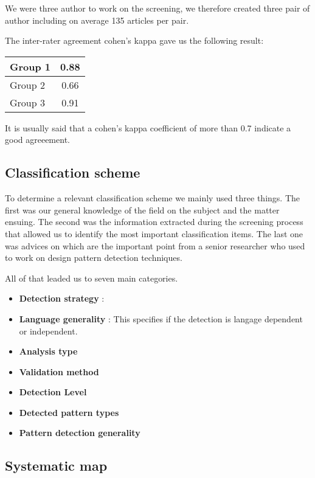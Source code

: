 \documentclass[letterpaper, 10 pt, conference]{ieeeconf}  %
\begin{document}
We were three author to work on the screening, we therefore created three pair of author including on average 135 articles per pair.

The inter-rater agreement cohen's kappa gave us the following result:

\begin{center}
  \begin{tabular}{ | l | c | }
    \hline
    Group 1 & 0.88 \\ \hline
    Group 2 & 0.66 \\ \hline
    Group 3 & 0.91 \\
    \hline
  \end{tabular}
\end{center}

It is usually said that a cohen's kappa coefficient of more than 0.7 indicate a good agreeement.%

\subsection{Classification scheme}

To determine a relevant classification scheme we mainly used three things. The first was our general knowledge of the field on the subject and the matter ensuing. The second was the information extracted during the screening process that allowed us to identify the most important classification items. The last one was advices on which are the important point from a senior researcher who used to work on design pattern detection techniques.

All of that leaded us to seven main categories.
\begin{itemize}
	\item \textbf{Detection strategy} : 
	\item \textbf{Language generality} : This specifies if the detection is langage dependent or independent.
	\item \textbf{Analysis type}
	\item \textbf{Validation method}
	\item \textbf{Detection Level}
	\item \textbf{Detected pattern types}
	\item \textbf{Pattern detection generality}
\end{itemize}


\subsection{Systematic map}
\end{document}
